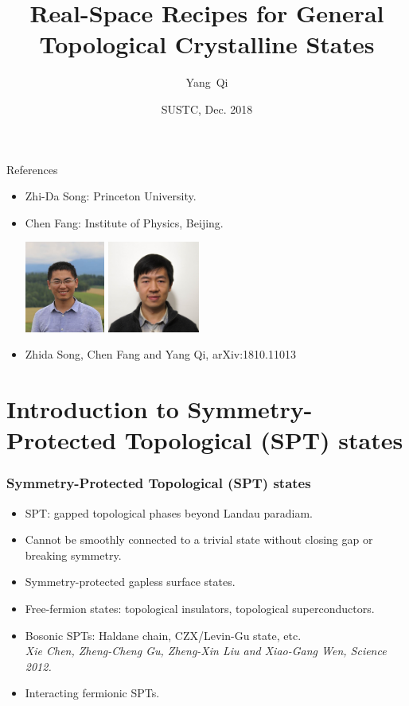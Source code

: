 \documentclass[xcolor=table, 10pt, aspectratio=43]{beamer}
\title[Space-group SPTs] %
{Real-Space Recipes for General Topological Crystalline States}
\author[Y Qi] %
{Yang~Qi}
\institute[Fudan] %
{Department of Physics, Fudan University}
\date{SUSTC, Dec. 2018}
\begin{document}
\begin{frame}
  \titlepage
\end{frame}

\begin{frame}{References}
\begin{itemize}
\item Zhi-Da Song: Princeton University.
\item Chen Fang: Institute of Physics, Beijing.
\begin{center}
	\includegraphics[height=3cm]{../people/zhidasong}
	\includegraphics[height=3cm]{../people/chenfang}
\end{center}
\item Zhida Song, Chen Fang and Yang Qi, arXiv:1810.11013
\end{itemize}
\end{frame}

\section{Introduction to Symmetry-Protected Topological (SPT) states}

\begin{frame}
  \frametitle{Symmetry-Protected Topological (SPT) states}
\begin{itemize}
\item SPT: gapped topological phases beyond Landau paradiam.
\item Cannot be smoothly connected to a trivial state without closing gap or breaking symmetry.
\item Symmetry-protected gapless surface states.
\item Free-fermion states: topological insulators, topological superconductors.
\item Bosonic SPTs: Haldane chain, CZX/Levin-Gu state, etc.\\
\emph{Xie Chen, Zheng-Cheng Gu, Zheng-Xin Liu and Xiao-Gang Wen, Science 2012.}
\item Interacting fermionic SPTs.
\end{itemize}
\end{frame}
\end{document}
